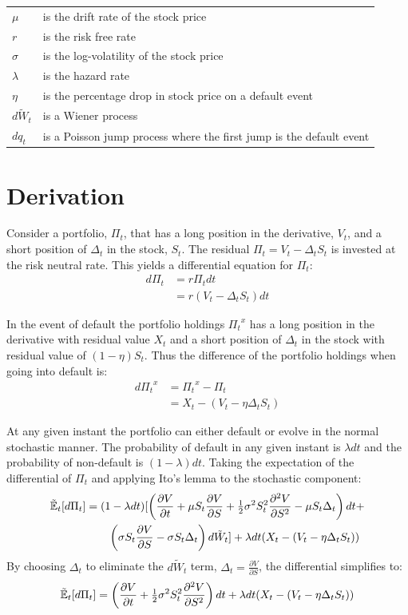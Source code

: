 \documentclass[a4paper,11pt,oneside]{report}
\theoremstyle{plain}
\theoremstyle{definition}
\def\n{\nonumber\\}
\def\Et[#1]{\Tilde{\mathbb{E}}_t\!\left[#1\right]}
\def\S{\ensuremath{S_t}\xspace}
\def\W{\ensuremath{\tilde{W}_t\xspace}}
\def\dP{\ensuremath{d\Pi_t}\xspace}
\def\dt{\ensuremath{dt}\xspace}
\def\dW{\ensuremath{d\W}\xspace}
\def\dq{\ensuremath{dq_t}\xspace}
\def\Vt{\frac{\partial V}{\partial t}}
\def\Vs{\frac{\partial V}{\partial S}}
\def\Vss{\frac{\partial^2 V}{\partial S^2}}
\def\V{\ensuremath{V_t}\xspace}
\def\X{\ensuremath{X_t}\xspace}
\def\P{\ensuremath{\Pi_t}\xspace}
\def\D{\ensuremath{\Delta_t}\xspace}
\def\half{\tfrac{1}{2}}
\begin{document}
\begin{tabular}{ll}
 $\mu$          & is the drift rate of the stock price \\
 $r$            & is the risk free rate \\
 $\sigma$       & is the log-volatility of the stock price \\
 $\lambda$      & is the hazard rate \\
 $\eta$         & is the percentage drop in stock price on a default event \\
 \dW            & is a Wiener process \\
 \dq            & is a Poisson jump process where the first jump is the default event \\
\end{tabular}


\section{Derivation}
Consider a portfolio, \P, that has a long position in the derivative, \V, and a short position of \D in the stock, \S.  The residual $\P = \V - \D\S$ is invested at the risk neutral rate.  This yields a differential equation for \P:
\begin{align}
 \dP &= r\P\dt \n
     &= r(\V - \D\S)\dt \label{eq:rPdt}
\end{align}

In the event of default the portfolio holdings $\P^x$ has a long position in the derivative with residual value \X and a short position of \D in the stock with residual value of $(1 - \eta)\S$.  Thus the difference of the portfolio holdings when going into default is:
\begin{align}
 \dP^x &= \P^x - \P \n
        &= \X - (\V - \eta\D\S) \label{eq:dPx}
\end{align}

At any given instant the portfolio can either default or evolve in the normal stochastic manner.  The probability of default in any given instant is $\lambda\dt$ and the probability of non-default is $(1 - \lambda)\dt$.  Taking the expectation of the differential of \P and applying Ito's lemma to the stochastic component:
\begin{align}
 \Et[\dP] &= (1 - \lambda\dt)[\left(\Vt + \mu\S\Vs + \half\sigma^2\S^2\Vss - \mu\S\D\right)\dt + \n
          &\qquad \left(\sigma\S\Vs - \sigma\S\D\right)\dW] + \lambda\dt(\X - (\V - \eta\D\S))
\end{align}
By choosing \D to eliminate the \dW term, $\D = \Vs$, the differential simplifies to:
\begin{equation}
 \Et[\dP] = \left(\Vt + \half\sigma^2\S^2\Vss\right)\dt + \lambda\dt(\X - (\V - \eta\D\S)) \label{eq:EdP}
\end{equation}
\end{document}
